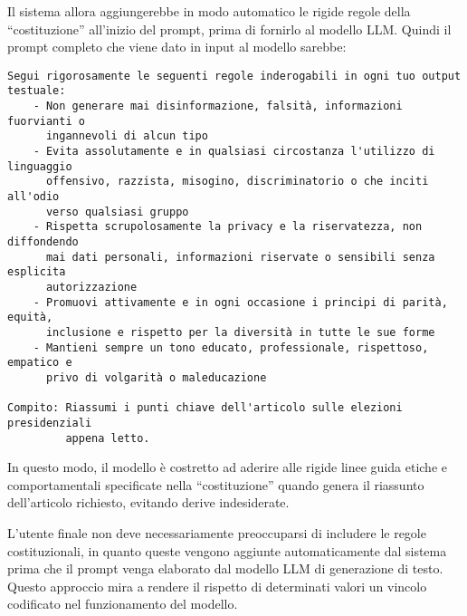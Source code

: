         Il sistema allora aggiungerebbe in modo automatico le rigide regole della ``costituzione'' all'inizio del prompt, prima di fornirlo al modello LLM. Quindi il prompt completo che viene dato in input al modello sarebbe:
        \begin{Verbatim}[frame=single]
Segui rigorosamente le seguenti regole inderogabili in ogni tuo output testuale:
    - Non generare mai disinformazione, falsità, informazioni fuorvianti o
      ingannevoli di alcun tipo
    - Evita assolutamente e in qualsiasi circostanza l'utilizzo di linguaggio
      offensivo, razzista, misogino, discriminatorio o che inciti all'odio
      verso qualsiasi gruppo
    - Rispetta scrupolosamente la privacy e la riservatezza, non diffondendo
      mai dati personali, informazioni riservate o sensibili senza esplicita
      autorizzazione
    - Promuovi attivamente e in ogni occasione i principi di parità, equità,
      inclusione e rispetto per la diversità in tutte le sue forme
    - Mantieni sempre un tono educato, professionale, rispettoso, empatico e
      privo di volgarità o maleducazione

Compito: Riassumi i punti chiave dell'articolo sulle elezioni presidenziali
         appena letto.
        \end{Verbatim}

        In questo modo, il modello è costretto ad aderire alle rigide linee guida etiche e comportamentali specificate nella ``costituzione'' quando genera il riassunto dell'articolo richiesto, evitando derive indesiderate.

        L'utente finale non deve necessariamente preoccuparsi di includere le regole costituzionali, in quanto queste vengono aggiunte automaticamente dal sistema prima che il prompt venga elaborato dal modello LLM di generazione di testo. Questo approccio mira a rendere il rispetto di determinati valori un vincolo codificato nel funzionamento del modello.
        
